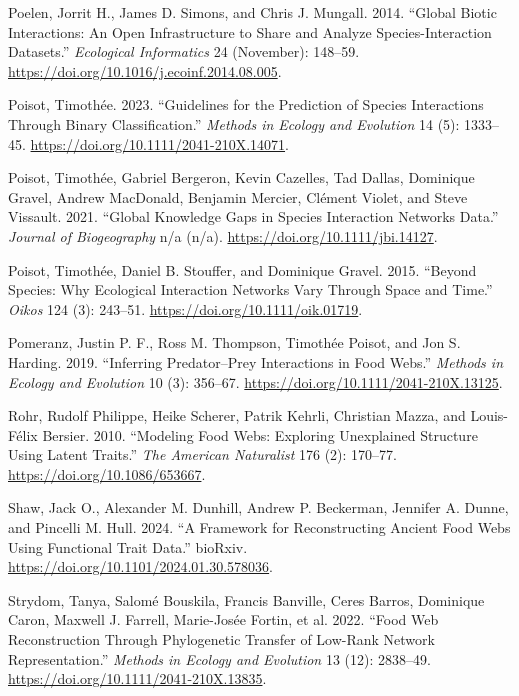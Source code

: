 \documentclass[
  letterpaper,
  DIV=11,
  numbers=noendperiod]{scrartcl}
\newlength{\cslhangindent}
\newenvironment{CSLReferences}[2] %
 {\begin{list}{}{%
  \setlength{\itemindent}{0pt}
  \setlength{\leftmargin}{0pt}
  \setlength{\parsep}{0pt}
  \ifodd #1
   \setlength{\leftmargin}{\cslhangindent}
   \setlength{\itemindent}{-1\cslhangindent}
  \fi
  \setlength{\itemsep}{#2\baselineskip}}}
 {\end{list}}
\begin{document}
\begin{CSLReferences}{1}{0}
Poelen, Jorrit H., James D. Simons, and Chris J. Mungall. 2014.
{``Global Biotic Interactions: {An} Open Infrastructure to Share and
Analyze Species-Interaction Datasets.''} \emph{Ecological Informatics}
24 (November): 148--59.
\url{https://doi.org/10.1016/j.ecoinf.2014.08.005}.

Poisot, Timothée. 2023. {``Guidelines for the Prediction of Species
Interactions Through Binary Classification.''} \emph{Methods in Ecology
and Evolution} 14 (5): 1333--45.
\url{https://doi.org/10.1111/2041-210X.14071}.

Poisot, Timothée, Gabriel Bergeron, Kevin Cazelles, Tad Dallas,
Dominique Gravel, Andrew MacDonald, Benjamin Mercier, Clément Violet,
and Steve Vissault. 2021. {``Global Knowledge Gaps in Species
Interaction Networks Data.''} \emph{Journal of Biogeography} n/a (n/a).
\url{https://doi.org/10.1111/jbi.14127}.

Poisot, Timothée, Daniel B. Stouffer, and Dominique Gravel. 2015.
{``Beyond Species: Why Ecological Interaction Networks Vary Through
Space and Time.''} \emph{Oikos} 124 (3): 243--51.
\url{https://doi.org/10.1111/oik.01719}.

Pomeranz, Justin P. F., Ross M. Thompson, Timothée Poisot, and Jon S.
Harding. 2019. {``Inferring Predator--Prey Interactions in Food Webs.''}
\emph{Methods in Ecology and Evolution} 10 (3): 356--67.
\url{https://doi.org/10.1111/2041-210X.13125}.

Rohr, Rudolf Philippe, Heike Scherer, Patrik Kehrli, Christian Mazza,
and Louis-Félix Bersier. 2010. {``Modeling {Food Webs}: {Exploring
Unexplained Structure Using Latent Traits}.''} \emph{The American
Naturalist} 176 (2): 170--77. \url{https://doi.org/10.1086/653667}.

Shaw, Jack O., Alexander M. Dunhill, Andrew P. Beckerman, Jennifer A.
Dunne, and Pincelli M. Hull. 2024. {``A Framework for Reconstructing
Ancient Food Webs Using Functional Trait Data.''} bioRxiv.
\url{https://doi.org/10.1101/2024.01.30.578036}.

Strydom, Tanya, Salomé Bouskila, Francis Banville, Ceres Barros,
Dominique Caron, Maxwell J. Farrell, Marie-Josée Fortin, et al. 2022.
{``Food Web Reconstruction Through Phylogenetic Transfer of Low-Rank
Network Representation.''} \emph{Methods in Ecology and Evolution} 13
(12): 2838--49. \url{https://doi.org/10.1111/2041-210X.13835}.


\end{CSLReferences}
\end{document}
